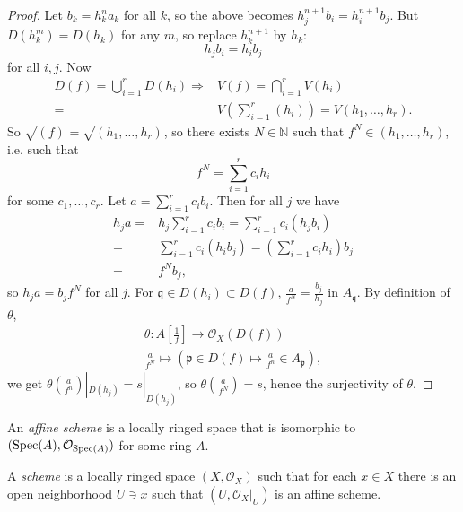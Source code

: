 \documentclass[12pt]{article}
\begin{document}
\begin{proof}
	Let $b_k=h^n_ka_k$ for all $k$, so the above becomes $h_j^{n+1}b_i=h_i^{n+1}b_j$. But $D(h_k^m)=D(h_k)$ for any $m$, so replace $h_k^{n+1}$ by $h_k$: 
	\begin{equation*}
		h_jb_i=h_ib_j
	\end{equation*}
	for all $i,j$. Now 
	\begin{align*}
		D(f) = \bigcup_{i=1}^r D(h_i)
		\Rightarrow& V(f) = \bigcap_{i=1}^r V(h_i) \\
		=& V(\sum_{i=1}^r(h_i))=V(h_1,\dots,h_r).
	\end{align*}
	So $\sqrt{(f)}=\sqrt{(h_1,\dots,h_r)}$, so there exists $N\in\mathbb{N}$ such that $f^N\in (h_1,\dots,h_r)$, i.e. such that 
	\begin{equation*}
		f^N=\sum_{i=1}^r c_ih_i
	\end{equation*}
	for some $c_1,\dots,c_r$. Let $a=\sum_{i=1}^r c_ib_i$. Then for all $j$ we have 
	\begin{align*}
		h_ja 
		=& h_j\sum_{i=1}^r c_ib_i = \sum_{i=1}^r c_i(h_jb_i) \\
		=& \sum_{i=1}^r c_i(h_ib_j) = \left(\sum_{i=1}^r c_ih_i\right)b_j \\
		=& f^N b_j,
	\end{align*}
	so $h_ja=b_jf^N$ for all $j$. For $\mathfrak{q}\in D(h_i)\subset D(f)$, $\frac{a}{f^N}=\frac{b_j}{h_j}$ in $A_\mathfrak{q}$. By definition of $\theta$, 
	\begin{gather*}
		\theta: A[\frac{1}{f}] \to \mathcal{O}_X(D(f)) \\
		\frac{a}{f^N} \mapsto (\mathfrak{p}\in D(f) \mapsto \frac{a}{f^n}\in A_\mathfrak{p}),
	\end{gather*}
	we get $\theta(\frac{a}{f^n})|_{D(h_j)}=s|_{D(h_j)}$, so $\theta(\frac{a}{f^N})=s$, hence the surjectivity of $\theta$.
\end{proof}

\begin{definition}
	An \emph{affine scheme} is a locally ringed space that is isomorphic to $(\text{Spec}(A), \mathcal{O}_{\text{Spec}(A)})$ for some ring $A$.
\end{definition}

\begin{definition}
	A \emph{scheme} is a locally ringed space $(X,\mathcal{O}_X)$ such that for each $x\in X$ there is an open neighborhood $U\ni x$ such that $(U,\mathcal{O}_X|_U)$ is an affine scheme.
\end{definition}
\end{document}
